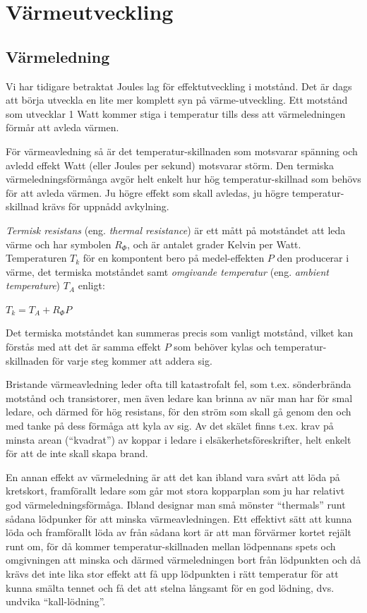 \section{Värmeutveckling}

\subsection{Värmeledning}

Vi har tidigare betraktat Joules lag för effektutveckling i motstånd.
Det är dags att börja utveckla en lite mer komplett syn på värme-utveckling.
Ett motstånd som utvecklar 1 Watt kommer stiga i temperatur tills dess att
värmeledningen förmår att avleda värmen.

För värmeavledning så är det temperatur-skillnaden som motsvarar spänning och
avledd effekt Watt (eller Joules per sekund) motsvarar störm. Den termiska
värmeledningsförmånga avgör helt enkelt hur hög temperatur-skillnad som behövs
för att avleda värmen. Ju högre effekt som skall avledas, ju högre temperatur-
skillnad krävs för uppnådd avkylning.

\emph{Termisk resistans} (eng. \emph{thermal resistance}) är ett mått på
motståndet att leda värme och har symbolen \(R_\Phi\), och är antalet grader
Kelvin per Watt. Temperaturen \(T_k\) för en kompontent bero på medel-effekten
\(P\) den producerar i värme, det termiska motståndet samt
\emph{omgivande temperatur} (eng. \emph{ambient temperature}) \(T_A\) enligt:

\(T_k = T_A + R_\Phi P\)

Det termiska motståndet kan summeras precis som vanligt motstånd, vilket kan
förstås med att det är samma effekt \(P\) som behöver kylas och temperatur-
skillnaden för varje steg kommer att addera sig.

Bristande värmeavledning leder ofta till katastrofalt fel, som t.ex.
sönderbrända motstånd och transistorer, men även ledare kan brinna av när man
har för smal ledare, och därmed för hög resistans, för den ström som skall gå
genom den och med tanke på dess förmåga att kyla av sig. Av det skälet finns
t.ex. krav på minsta arean (``kvadrat'') av koppar i ledare i
elsäkerhetsföreskrifter, helt enkelt för att de inte skall skapa brand.

En annan effekt av värmeledning är att det kan ibland vara svårt att löda på
kretskort, framförallt ledare som går mot stora kopparplan som ju har relativt
god värmeledningsförmåga. Ibland designar man små mönster ``thermals'' runt
sådana lödpunker för att minska värmeavledningen. Ett effektivt sätt att
kunna löda och framförallt löda av från sådana kort är att man förvärmer kortet
rejält runt om, för då kommer temperatur-skillnaden mellan lödpennans spets
och omgivningen att minska och därmed värmeledningen bort från lödpunkten och
då krävs det inte lika stor effekt att få upp lödpunkten i rätt temperatur för
att kunna smälta tennet och få det att stelna långsamt för en god lödning, dvs.
undvika ``kall-lödning''.

